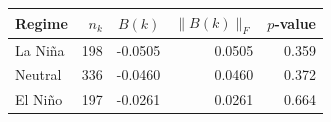 \begin{tabular}{lrrrr}
\toprule
Regime & $n_k$ & $B(k)$ & $\|B(k)\|_F$ & $p$-value \\
\midrule
La Niña & 198 & -0.0505 & 0.0505 & 0.359 \\
Neutral & 336 & -0.0460 & 0.0460 & 0.372 \\
El Niño & 197 & -0.0261 & 0.0261 & 0.664 \\
\bottomrule
\end{tabular}
